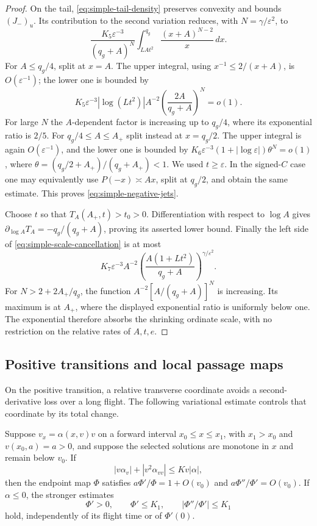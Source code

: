 \begin{proof}
On the tail, \eqref{eq:simple-tail-density} preserves convexity and
bounds $(J_-)_u$. Its contribution to the second variation reduces,
with $N=\gamma/\varepsilon^2$, to
\begin{equation}\label{eq:simple-tail-integral}
 \frac{K_5\varepsilon^{-3}}{(q_g+A)^N}
       \int_{LAt^2}^{q_g}\frac{(x+A)^{N-2}}x\,dx.
\end{equation}
For $A\le q_g/4$, split at $x=A$.  The upper integral, using
$x^{-1}\le2/(x+A)$, is $O(\varepsilon^{-1})$; the lower one is bounded
by
\[
 K_5\varepsilon^{-3}|\log(Lt^2)|A^{-2}
       \left(\frac{2A}{q_g+A}\right)^N=o(1).
\]
For large $N$ the $A$-dependent factor is increasing up to $q_g/4$,
where its exponential ratio is $2/5$.
For $q_g/4\le A\le A_+$ split instead at $x=q_g/2$.
The upper integral is again $O(\varepsilon^{-1})$, and the lower one
is bounded by
$K_6\varepsilon^{-3}(1+|\log\varepsilon|)\theta^N=o(1)$,
where $\theta=(q_g/2+A_+)/(q_g+A_+)<1$.
We used $t\ge\varepsilon$.  In the signed-$C$ case one may equivalently
use $P(-x)\asymp Ax$, split at $q_g/2$, and obtain the same estimate.
This proves \eqref{eq:simple-negative-jets}.

Choose $t$ so that $T_A(A_+,t)>t_0>0$.  Differentiation with respect
to $\log A$ gives
$\partial_{\log A}T_A=-q_g/(q_g+A)$, proving its asserted lower
bound.  Finally the left side of \eqref{eq:simple-scale-cancellation}
is at most
\[
 K_7\varepsilon^{-3}A^{-2}
       \left(\frac{A(1+Lt^2)}{q_g+A}\right)^{\gamma/\varepsilon^2}.
\]
For $N>2+2A_+/q_g$, the function
$A^{-2}[A/(q_g+A)]^N$ is increasing.  Its maximum is at $A_+$,
where the displayed exponential ratio is uniformly below one.
The exponential therefore absorbs the shrinking ordinate scale, with
no restriction on the relative rates of $A,t,e$.
\end{proof}

\subsection{Positive transitions and local passage maps}

On the positive transition, a relative transverse coordinate avoids a
second-derivative loss over a long flight. The following variational
estimate controls that coordinate by its total change.

\begin{lemma}\label{lem:normal-distortion}
Suppose $v_x=\alpha(x,v)v$ on a forward interval
$x_0\le x\le x_1$, with $x_1>x_0$ and $v(x_0,a)=a>0$, and suppose the
selected solutions are monotone in $x$ and remain below $v_0$.  If
\[
 |v\alpha_v|+|v^2\alpha_{vv}|\le K v|\alpha|,
\]
then the endpoint map $\Phi$ satisfies
$a\Phi'/\Phi=1+O(v_0)$ and $a\Phi''/\Phi'=O(v_0)$.
If $\alpha\le0$, the stronger estimates
\begin{equation}\label{eq:simple-contracting-distortion}
 \Phi'>0,\qquad \Phi'\le K_1,\qquad
 |\Phi''/\Phi'|\le K_1
\end{equation}
hold, independently of its flight time or of $\Phi'(0)$.
\end{lemma}

